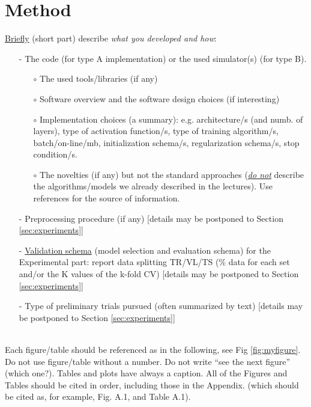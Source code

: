 \documentclass[12pt, letterpaper]{article}  %
\begin{document}
\section{Method}
\underline{Briefly} (short part) describe \textit{what you developed and how}:
\begin{itemize}
    \setlength\itemsep{0em}
    \item[-] The code (for type A implementation) or the used simulator(s) (for type B). 
        \begin{itemize}
            \setlength\itemsep{0em}
            \item[$\circ$] The used tools/libraries (if any) 
            \item[$\circ$] Software overview and the software design choices (if interesting)
            \item[$\circ$] Implementation choices (a summary): e.g. architecture/s (and numb. of layers), type of activation function/s, type of training algorithm/s, batch/on-line/mb, initialization schema/s, regularization schema/s, stop condition/s.
            \item[$\circ$] The novelties (if any) but not the standard approaches (\underline{\textit{do not}} describe the algorithms/models we already described in the lectures). Use references for the source of information. 
        \end{itemize}
        \item[-] Preprocessing procedure (if any) [details may be postponed to Section \ref{sec:experiments}]
        \item[-] \underline{Validation schema} (model selection and evaluation schema) for the Experimental part: report data splitting  TR/VL/TS (\% data for each set and/or the K values of the k-fold CV) [details may be postponed to Section \ref{sec:experiments}]
        \item[-] Type of preliminary trials pursued (often summarized by text) [details may be postponed to Section \ref{sec:experiments}]
\end{itemize}


\noindent \\ Each figure/table should be referenced as in the following, see Fig \ref{fig:myfigure}. 
Do not use figure/table without a number. Do not write “see the next figure” (which one?).
Tables and plots have always a caption. All of the Figures and Tables should be cited in order, including those in the Appendix. (which should be cited as, for example, Fig. A.1, and Table A.1).  
\end{document}
